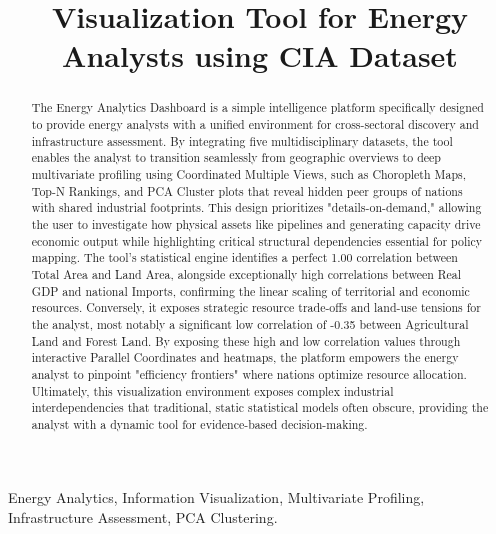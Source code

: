 \documentclass[conference]{IEEEtran}
\begin{document}
\title{Visualization Tool for Energy Analysts using CIA Dataset}
\author{
}

\maketitle

\begin{abstract}
The Energy Analytics Dashboard is a simple intelligence platform specifically designed to provide energy analysts with a unified environment for cross-sectoral discovery and infrastructure assessment. By integrating five multidisciplinary datasets, the tool enables the analyst to transition seamlessly from geographic overviews to deep multivariate profiling using Coordinated Multiple Views, such as Choropleth Maps, Top-N Rankings, and PCA Cluster plots that reveal hidden peer groups of nations with shared industrial footprints. This design prioritizes "details-on-demand," allowing the user to investigate how physical assets like pipelines and generating capacity drive economic output while highlighting critical structural dependencies essential for policy mapping. The tool’s statistical engine identifies a perfect 1.00 correlation between Total Area and Land Area, alongside exceptionally high correlations between Real GDP and national Imports, confirming the linear scaling of territorial and economic resources. Conversely, it exposes strategic resource trade-offs and land-use tensions for the analyst, most notably a significant low correlation of -0.35 between Agricultural Land and Forest Land. By exposing these high and low correlation values through interactive Parallel Coordinates and heatmaps, the platform empowers the energy analyst to pinpoint "efficiency frontiers" where nations optimize resource allocation. Ultimately, this visualization environment exposes complex industrial interdependencies that traditional, static statistical models often obscure, providing the analyst with a dynamic tool for evidence-based decision-making.
\end{abstract}

\begin{IEEEkeywords}
Energy Analytics, Information Visualization, Multivariate Profiling, Infrastructure Assessment, PCA Clustering.
\end{IEEEkeywords}
\end{document}
